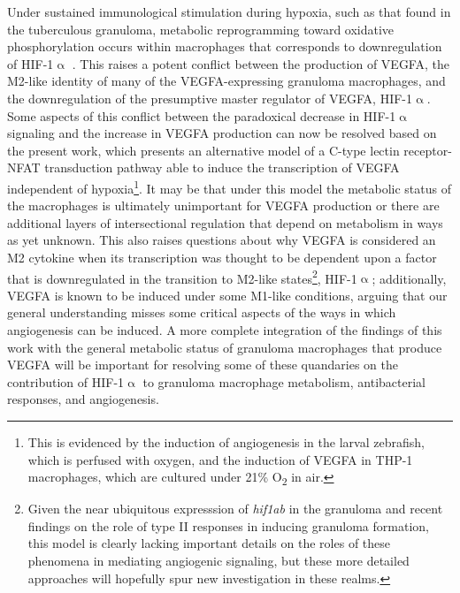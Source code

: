 Under sustained immunological stimulation during hypoxia, such as that found in the tuberculous granuloma, metabolic reprogramming toward oxidative phosphorylation occurs within macrophages that corresponds to downregulation of HIF\hyp{}1$\upalpha$ \citep{Wilson2019, Mehrotra2014}. This raises a potent conflict between the production of VEGFA, the M2\hyp{}like identity of many of the VEGFA\hyp{}expressing granuloma macrophages, and the downregulation of the presumptive master regulator of VEGFA, HIF\hyp{}1$\upalpha$. Some aspects of this conflict between the paradoxical decrease in HIF\hyp{}1$\upalpha$ signaling and the increase in VEGFA production can now be resolved based on the present work, which presents an alternative model of a C\hyp{}type lectin receptor\hyp{}NFAT transduction pathway able to induce the transcription of VEGFA independent of hypoxia\footnote{This is evidenced by the induction of angiogenesis in the larval zebrafish, which is perfused with oxygen, and the induction of VEGFA in THP\hyp{}1 macrophages, which are cultured under 21\% O\textsubscript{2} in air.}. It may be that under this model the metabolic status of the macrophages is ultimately unimportant for VEGFA production or there are additional layers of intersectional regulation that depend on metabolism in ways as yet unknown. This also raises questions about why VEGFA is considered an M2 cytokine when its transcription was thought to be dependent upon a factor that is downregulated in the transition to M2\hyp{}like states\footnote{Given the near ubiquitous expresssion of \textit{hif1ab} in the granuloma and recent findings on the role of type II responses in inducing granuloma formation, this model is clearly lacking important details on the roles of these phenomena in mediating angiogenic signaling, but these more detailed approaches will hopefully spur new investigation in these realms.}, HIF\hyp{}1$\upalpha$; additionally, VEGFA is known to be induced under some M1\hyp{}like conditions, arguing that our general understanding misses some critical aspects of the ways in which angiogenesis can be induced. A more complete integration of the findings of this work with the general metabolic status of granuloma macrophages that produce VEGFA will be important for resolving some of these quandaries on the contribution of HIF\hyp{}1$\upalpha$ to granuloma macrophage metabolism, antibacterial responses, and angiogenesis.

